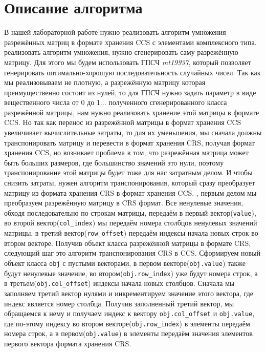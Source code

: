\documentclass[14pt,a4paper,report]{ncc}
\begin{document}
	
	\section*{Описание алгоритма}
	В нашей лабораторной работе нужно реализовать алгоритм умножения разрежённых матриц в формате хранения CCS с элементами комплексного типа.
	 реализовать алгоритм умножения, нужно сгенерировать саму разрежённую матрицу. Для этого мы будем использовать ГПСЧ \textit{mt19937}, который позволяет генерировать оптимально-хорошую последовательность случайных чисел. Так как мы реализовываем не плотную, а разрежённую матрицу которая преимущественно состоит из нулей, то для ГПСЧ нужно задать параметр в виде вещественного числа от 0 до 1...
	 полученного сгенерированного класса разрежённой матрицы, нам нужно реализовать хранение этой матрицы в формате CCS. Но так как перенос из разрежённой матрицы в формат хранения CCS увеличивает вычислительные затраты, то для их уменьшения, мы сначала должны транспонировать матрицу и перевести в формат хранения CRS, получая формат хранения CCS, но возникает проблема в том, что разрежённая матрица может быть больших размеров, где большинство значений это нули, поэтому транспонирование этой матрицы будет тоже для нас затратным делом. И чтобы снизить затраты, нужен алгоритм транспонирования, который сразу преобразует матрицу из формата хранения CRS в формат хранения CCS.
	, первым делом мы преобразуем разрежённую матрицу в CRS формат. Все ненулевые значения, обходя последовательно по строкам матрицы, передаём в первый вектор(\verb|value|), во второй вектор(\verb|col_index|) мы передаём номера столбцов ненулевых значений матрицы, в третий вектор(\verb|row_offset|) передаём индексы начала новых строк во втором векторе. Получив объект класса разрежённой матрицы в формате CRS, следующий шаг это алгоритм транспонирования CRS в CCS. Сформируем новый объект класса \verb|obj| с пустыми векторами, в первом векторе(\verb|obj.value|) также будут ненулевые значение, во втором(\verb|obj.row_index|) уже будут номера строк, а в третьем(\verb|obj.col_offset|) индексы начала новых столбцов. Сначала мы заполняем третий вектор  нулями и инкрементируем значение этого вектора, где индекс является номер столбца. Получив заполненный третий вектор, мы обращаемся к нему и получаем индекс к вектору \verb|obj.col_offset| и \verb|obj.value|, где по-этому индексу во втором векторе(\verb|obj.row_index|) в элементы передаём номера строк, а в первом(\verb|obj.value|) в элементы передаём значения элементов первого вектора формата хранения CRS.
\end{document}
